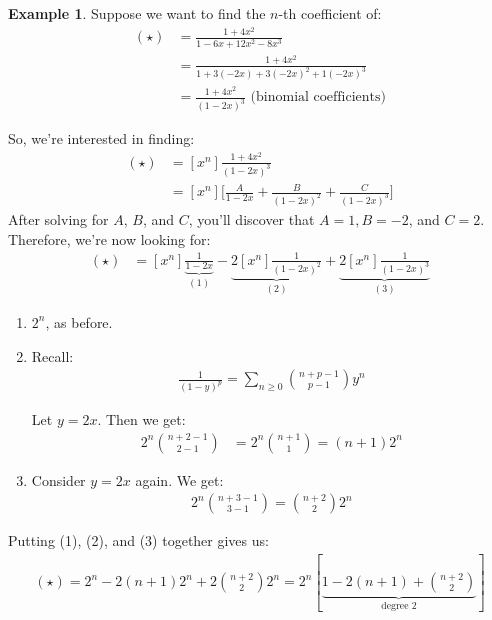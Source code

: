 \documentclass[]{article}
\theoremstyle{definition}
\newtheorem{ex}{Example}[section]
\begin{document}
		\begin{ex}
			Suppose we want to find the $n$-th coefficient of:
			\begin{align*}
				(\star) &= \frac{1 + 4x^2}{1 - 6x + 12x^2 - 8x^3} \\
					&= \frac{1 + 4x^2}{1 + 3(-2x) + 3(-2x)^2 + 1(-2x)^3} \\
					&= \frac{1 + 4x^2}{(1 - 2x)^3} \text{ (binomial coefficients)}
			\end{align*}

			So, we're interested in finding:
			\begin{align*}
				[x^n](\star) &= [x^n] \frac{1 + 4x^2}{(1 - 2x)^3} \\
				&= [x^n] \bigg[ \frac{A}{1 - 2x} + \frac{B}{(1 - 2x)^2} + \frac{C}{(1 - 2x)^3} \bigg]
			\end{align*}
			After solving for $A$, $B$, and $C$, you'll discover that $A = 1, B = -2$, and $C = 2$. Therefore, we're now looking for:
			\begin{align*}
				[x^n](\star) &= [x^n] \underbrace{\frac{1}{1 - 2x}}_{(1)} - \underbrace{2[x^n]\frac{1}{(1 - 2x)^2}}_{(2)} + \underbrace{2[x^n] \frac{1}{(1 - 2x)^3}}_{(3)}
			\end{align*}

			\begin{enumerate}
				\item $2^n$, as before.
				\item Recall:
					\begin{align*}
						\frac{1}{(1 - y)^p} = \sum_{n \ge 0} \binom{n + p - 1}{p - 1} y^n
					\end{align*}

					Let $y = 2x$. Then we get:
					\begin{align*}
						2^n \binom{n + 2 - 1}{2 - 1} &= 2^n \binom{n + 1}{1} = (n + 1)2^n
					\end{align*}
				\item Consider $y = 2x$ again. We get:
					\begin{align*}
						2^n \binom{n + 3 - 1}{3 - 1} = \binom{n + 2}{2} 2^n
					\end{align*}
			\end{enumerate}

			Putting (1), (2), and (3) together gives us:
			\begin{align*}
				[x^n](\star) = 2^n - 2(n + 1)2^n + 2 \binom{n + 2}{2} 2^n = 2^n[\underbrace{1 - 2(n + 1) + \binom{n + 2}{2}}_{\text{degree 2}}]
			\end{align*}
		\end{ex}
\end{document}
